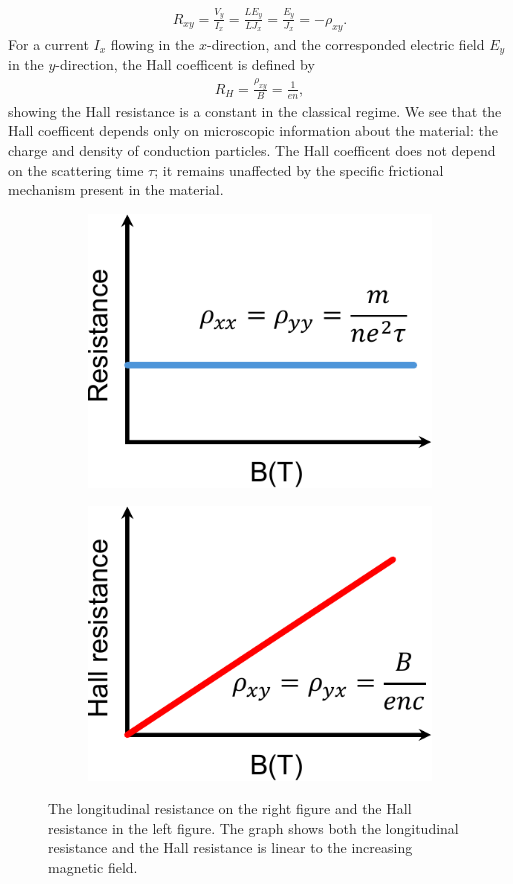 \begin{gather}
	R_{xy} = \frac{V_{y}}{I_{x}} = \frac{L E_{y}}{L J_{x}} = \frac{E_{y}}{J_{x}} = -\rho_{xy}.
\end{gather}
For a current $I_{x}$ flowing in the $x$-direction, and the corresponded electric field $E_{y}$ in the $y$-direction, the Hall coefficent is defined by
\begin{gather}
	R_{H} = \frac{\rho_{xy}}{B} = \frac{1}{en} ,
\end{gather}
showing the Hall resistance is a constant in the classical regime. We see that the Hall coefficent depends only on microscopic information about the material: the charge and density of conduction particles. The Hall coefficent does not depend on the scattering time $\tau$; it remains unaffected by the specific frictional mechanism present in the material.
\begin{figure}[htb]
	\centering
	\begin{subfigure}[b]{0.495\textwidth}
		\centering
		{\includegraphics[width=0.75\linewidth]{pic/classRess.pdf}}
	\end{subfigure}
	\begin{subfigure}[b]{0.495\textwidth}
		\centering
		\includegraphics[width=0.75\linewidth]{pic/HallRess.pdf}
	\end{subfigure}
	\caption[Logitudinal resistance and Hall resistance plot.]{
		The longitudinal resistance on the right figure and the Hall resistance in the left figure. The graph shows both the longitudinal resistance and the Hall resistance is linear to the increasing magnetic field.
	}
\end{figure}
